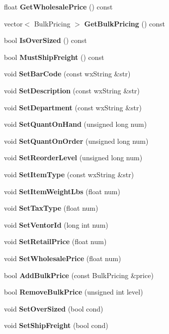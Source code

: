 \begin{CompactItemize}
\item 
float {\bf Get\-Wholesale\-Price} () const \label{classYardInvType_a14}

\item 
vector$<$ Bulk\-Pricing $>$ {\bf Get\-Bulk\-Pricing} () const \label{classYardInvType_a15}

\item 
bool {\bf Is\-Over\-Sized} () const \label{classYardInvType_a16}

\item 
bool {\bf Must\-Ship\-Freight} () const \label{classYardInvType_a17}

\item 
void {\bf Set\-Bar\-Code} (const wx\-String \&str)\label{classYardInvType_a18}

\item 
void {\bf Set\-Description} (const wx\-String \&str)\label{classYardInvType_a19}

\item 
void {\bf Set\-Department} (const wx\-String \&str)\label{classYardInvType_a20}

\item 
void {\bf Set\-Quant\-On\-Hand} (unsigned long num)\label{classYardInvType_a21}

\item 
void {\bf Set\-Quant\-On\-Order} (unsigned long num)\label{classYardInvType_a22}

\item 
void {\bf Set\-Reorder\-Level} (unsigned long num)\label{classYardInvType_a23}

\item 
void {\bf Set\-Item\-Type} (const wx\-String \&str)\label{classYardInvType_a24}

\item 
void {\bf Set\-Item\-Weight\-Lbs} (float num)\label{classYardInvType_a25}

\item 
void {\bf Set\-Tax\-Type} (float num)\label{classYardInvType_a26}

\item 
void {\bf Set\-Ventor\-Id} (long int num)\label{classYardInvType_a27}

\item 
void {\bf Set\-Retail\-Price} (float num)\label{classYardInvType_a28}

\item 
void {\bf Set\-Wholesale\-Price} (float num)\label{classYardInvType_a29}

\item 
bool {\bf Add\-Bulk\-Price} (const Bulk\-Pricing \&price)\label{classYardInvType_a30}

\item 
bool {\bf Remove\-Bulk\-Price} (unsigned int level)\label{classYardInvType_a31}

\item 
void {\bf Set\-Over\-Sized} (bool cond)\label{classYardInvType_a32}

\item 
void {\bf Set\-Ship\-Freight} (bool cond)\label{classYardInvType_a33}

\end{CompactItemize}
